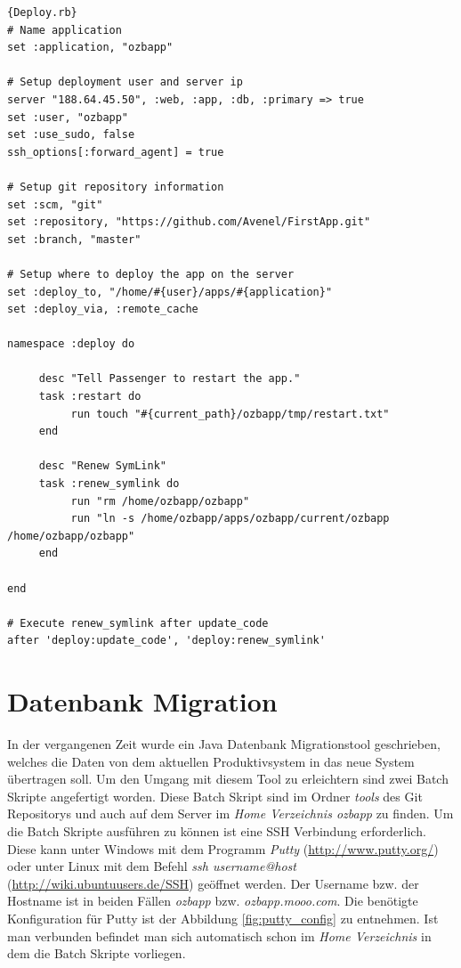 \documentclass[12pt,             %
               a4paper,          %
               listof=totoc,     %
               index=totoc,      %
               bibliography=totoc,%
               oneside,         %
               BCOR1cm,          %
               english   %
               ]{scrbook}
\begin{document}
\begin{lstlisting}[frame=single, caption=Capistrano Deployment Rezept, tabsize=2, flexiblecolumns=true, captionpos=b]{Deploy.rb}
# Name application
set :application, "ozbapp"

# Setup deployment user and server ip
server "188.64.45.50", :web, :app, :db, :primary => true
set :user, "ozbapp"
set :use_sudo, false
ssh_options[:forward_agent] = true

# Setup git repository information
set :scm, "git"
set :repository, "https://github.com/Avenel/FirstApp.git"
set :branch, "master"

# Setup where to deploy the app on the server
set :deploy_to, "/home/#{user}/apps/#{application}"
set :deploy_via, :remote_cache

namespace :deploy do

     desc "Tell Passenger to restart the app."
     task :restart do
          run touch "#{current_path}/ozbapp/tmp/restart.txt"
     end

     desc "Renew SymLink"
     task :renew_symlink do
          run "rm /home/ozbapp/ozbapp"
          run "ln -s /home/ozbapp/apps/ozbapp/current/ozbapp /home/ozbapp/ozbapp"
     end

end

# Execute renew_symlink after update_code
after 'deploy:update_code', 'deploy:renew_symlink'
\end{lstlisting}

\clearpage
\section{Datenbank Migration}
In der vergangenen Zeit wurde ein Java Datenbank Migrationstool geschrieben, welches die Daten von dem aktuellen Produktivsystem in das neue System übertragen soll. Um den Umgang mit diesem Tool zu erleichtern sind zwei Batch Skripte angefertigt worden. Diese Batch Skript sind im Ordner \textit{tools} des Git Repositorys und auch auf dem Server im \textit{Home Verzeichnis ozbapp} zu finden. Um die Batch Skripte ausführen zu können ist eine SSH Verbindung erforderlich. Diese kann unter Windows mit dem Programm \textit{Putty} (\url{http://www.putty.org/}) oder unter Linux mit dem Befehl \textit{ssh username@host} (\url{http://wiki.ubuntuusers.de/SSH}) geöffnet werden. Der Username bzw. der Hostname ist in beiden Fällen \textit{ozbapp} bzw. \textit{ozbapp.mooo.com}. Die benötigte Konfiguration für Putty ist der Abbildung \vref{fig:putty_config} zu entnehmen. Ist man verbunden befindet man sich automatisch schon im \textit{Home Verzeichnis} in dem die Batch Skripte vorliegen.\\ 
\end{document}
